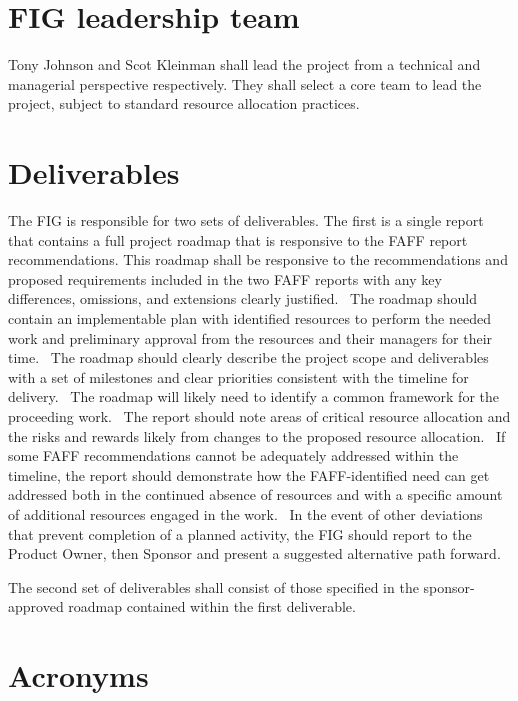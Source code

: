 \documentclass[SE,authoryear,lsstdraft]{lsstdoc}
\begin{document}
\section{FIG leadership team}
Tony Johnson and Scot Kleinman shall lead the project from a technical
and managerial perspective respectively. They shall select a core team
to lead the project, subject to standard resource allocation practices. 


\section{Deliverables}
The FIG is responsible for two sets of deliverables. The first is a
single report that contains a full project roadmap that is responsive to
the FAFF report recommendations. This roadmap shall be responsive to the
recommendations and proposed requirements included in the two FAFF reports
with any key differences, omissions, and extensions clearly justified. 
The roadmap should contain an implementable plan with identified resources
to perform the needed work and preliminary approval from the resources
and their managers for their time.  The roadmap should clearly describe
the project scope and deliverables with a set of milestones and clear
priorities consistent with the timeline for delivery.  The roadmap will
likely need to identify a common framework for the proceeding work.  The
report should note areas of critical resource allocation and the risks
and rewards likely from changes to the proposed resource allocation. 
If some FAFF recommendations cannot be adequately addressed within the
timeline, the report should demonstrate how the FAFF-identified need
can get addressed both in the continued absence of resources and with
a specific amount of additional resources engaged in the work.  In the
event of other deviations that prevent completion of a planned activity,
the FIG should report to the Product Owner, then Sponsor and present a
suggested alternative path forward.


The second set of deliverables shall consist of those specified in the sponsor-approved roadmap contained within the first deliverable.  


\appendix
%

\section{Acronyms} \label{sec:acronyms}

\end{document}
